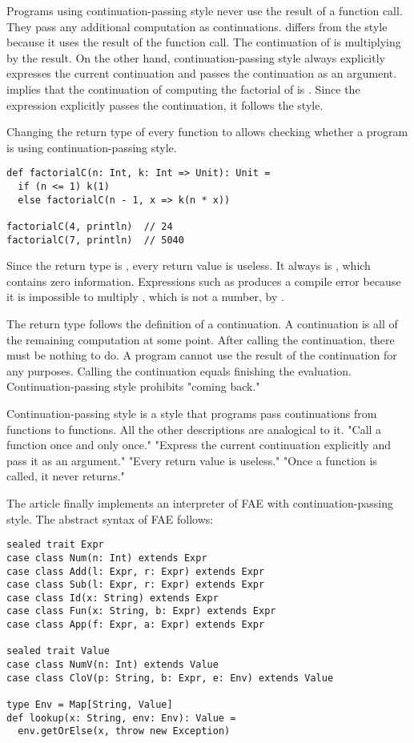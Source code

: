 Programs using continuation-passing style never use the result of a function
call. They pass any additional computation as continuations.  differs from the style because it uses the result of the
function call. The continuation of  is multiplying
 by the result. On the other hand, continuation-passing style always
explicitly expresses the current continuation and passes the continuation as an
argument.  implies that the continuation
of computing the factorial of  is . Since the
expression explicitly passes the continuation, it follows the style.

Changing the return type of every function to  allows checking whether
a program is using continuation-passing style.

\begin{verbatim}
def factorialC(n: Int, k: Int => Unit): Unit =
  if (n <= 1) k(1)
  else factorialC(n - 1, x => k(n * x))

factorialC(4, println)  // 24
factorialC(7, println)  // 5040
\end{verbatim}

Since the return type is , every return value is useless. It always is
\code{()}, which contains zero information. Expressions such as  produces a compile error because it is impossible to
multiply \code{()}, which is not a number, by .

The  return type follows the definition of a continuation. A
continuation is all of the remaining computation at some point. After calling the
continuation, there must be nothing to do. A program cannot use the result of the
continuation for any purposes. Calling the continuation equals finishing the
evaluation. Continuation-passing style prohibits "coming back."

Continuation-passing style is a style that programs pass continuations from
functions to functions. All the other descriptions are analogical to it. "Call a
function once and only once." "Express the current continuation explicitly and
pass it as an argument." "Every return value is useless." "Once a function is
called, it never returns."

The article finally implements an interpreter of FAE with continuation-passing
style. The abstract syntax of FAE follows:

\begin{verbatim}
sealed trait Expr
case class Num(n: Int) extends Expr
case class Add(l: Expr, r: Expr) extends Expr
case class Sub(l: Expr, r: Expr) extends Expr
case class Id(x: String) extends Expr
case class Fun(x: String, b: Expr) extends Expr
case class App(f: Expr, a: Expr) extends Expr

sealed trait Value
case class NumV(n: Int) extends Value
case class CloV(p: String, b: Expr, e: Env) extends Value

type Env = Map[String, Value]
def lookup(x: String, env: Env): Value =
  env.getOrElse(x, throw new Exception)
\end{verbatim}

